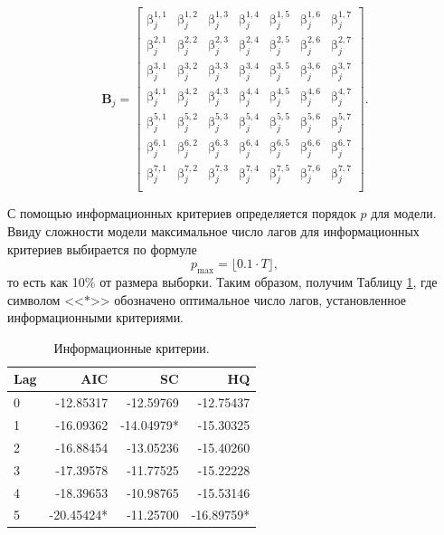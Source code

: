 \documentclass[a4paper, 14pt]{extreport}
\numberwithin{equation}{section}
\renewcommand{\beta}{\upbeta}
\numberwithin{equation}{section}
\begin{document}
	\begin{equation*}
		\mathbf B_j = 
		\begin{bmatrix}
			\beta_j^{1,1} & \beta_j^{1,2} & \beta_j^{1,3} & \beta_j^{1,4} & \beta_j^{1,5} & \beta_j^{1,6} & \beta_j^{1,7} \\[1ex] 
			\beta_j^{2,1} & \beta_j^{2,2} & \beta_j^{2,3} & \beta_j^{2,4} & \beta_j^{2,5} & \beta_j^{2,6} & \beta_j^{2,7} \\[1ex] 
			\beta_j^{3,1} & \beta_j^{3,2} & \beta_j^{3,3} & \beta_j^{3,4} & \beta_j^{3,5} & \beta_j^{3,6} & \beta_j^{3,7} \\[1ex] 
			\beta_j^{4,1} & \beta_j^{4,2} & \beta_j^{4,3} & \beta_j^{4,4} & \beta_j^{4,5} & \beta_j^{4,6} & \beta_j^{4,7} \\[1ex] 
			\beta_j^{5,1} & \beta_j^{5,2} & \beta_j^{5,3} & \beta_j^{5,4} & \beta_j^{5,5} & \beta_j^{5,6} & \beta_j^{5,7} \\[1ex] 
			\beta_j^{6,1} & \beta_j^{6,2} & \beta_j^{6,3} & \beta_j^{6,4} & \beta_j^{6,5} & \beta_j^{6,6} & \beta_j^{6,7} \\[1ex] 
			\beta_j^{7,1} & \beta_j^{7,2} & \beta_j^{7,3} & \beta_j^{7,4} & \beta_j^{7,5} & \beta_j^{7,6} & \beta_j^{7,7} \\[1ex] 
		\end{bmatrix}.
	\end{equation*}
	
	С помощью информационных критериев определяется порядок $p$ для модели. Ввиду сложности модели максимальное число лагов для информационных критериев выбирается по формуле
	\begin{equation}
		p_{\max} = \lfloor 0.1\cdot T\rfloor,
	\end{equation}
	то есть как 10\% от размера выборки. Таким образом, получим Таблицу \ref{tab:IC}, где символом <<$*$>> обозначено оптимальное число лагов, установленное информационными критериями.
	
	\begin{table}[!htbp]
		\centering
		\begin{tabular}{lrrr}
			\toprule
			Lag & AIC & SC & HQ \\
			\midrule
			0 & -12.85317 & -12.59769 & -12.75437 \\
			1 & -16.09362 & -14.04979* & -15.30325 \\
			2 & -16.88454 & -13.05236 & -15.40260 \\
			3 & -17.39578 & -11.77525 & -15.22228 \\
			4 & -18.39653 & -10.98765 & -15.53146 \\
			5 & -20.45424* & -11.25700 & -16.89759* \\
			\bottomrule
		\end{tabular}
		\caption{Информационные критерии.}
		\label{tab:IC}
	\end{table}
	
\end{document}
